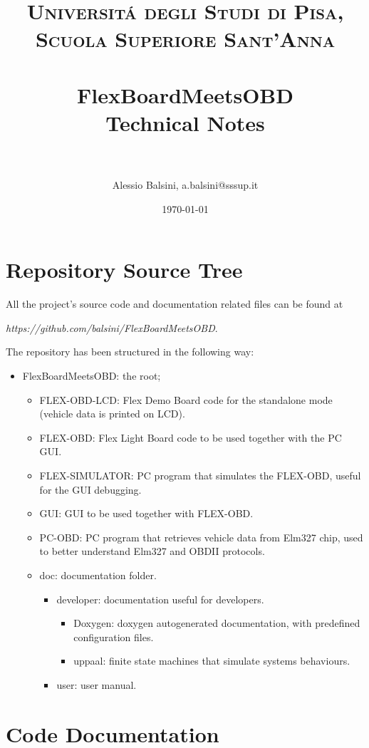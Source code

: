 \documentclass[paper=a4, fontsize=11pt]{scrartcl} %
\title{	
\normalfont \normalsize 
\textsc{Universit\'a degli Studi di Pisa, Scuola Superiore Sant'Anna} \\ [25pt] %
\horrule{0.5pt} \\[0.4cm] %
\huge FlexBoardMeetsOBD \\ %
\large Technical Notes \\
\horrule{2pt} \\[0.5cm] %
}
\author{Alessio Balsini, a.balsini@sssup.it} %
\date{\normalsize\today} %
\numberwithin{equation}{section} %
\numberwithin{figure}{section} %
\numberwithin{table}{section} %
\begin{document}
\maketitle %

\section{Repository Source Tree}

All the project's source code and documentation related files can be found at

\emph{https://github.com/balsini/FlexBoardMeetsOBD}.

The repository has been structured in the following way:

\begin{itemize}
	\item FlexBoardMeetsOBD: the root;
		\begin{itemize}
		\item FLEX-OBD-LCD: Flex Demo Board code for the standalone mode (vehicle data is printed on LCD).
		\item FLEX-OBD: Flex Light Board code to be used together with the PC GUI.
		\item FLEX-SIMULATOR: PC program that simulates the FLEX-OBD, useful for the GUI debugging.
		\item GUI: GUI to be used together with FLEX-OBD.
		\item PC-OBD: PC program that retrieves vehicle data from Elm327 chip, used to better understand Elm327 and OBDII protocols.
		\item doc: documentation folder.
		\begin{itemize}
			\item developer: documentation useful for developers.
			\begin{itemize}
				\item Doxygen: doxygen autogenerated documentation, with predefined configuration files.
				\item uppaal: finite state machines that simulate systems behaviours.
			\end{itemize}
			\item user: user manual.
		\end{itemize}
		\end{itemize}
\end{itemize}

\section{Code Documentation}
\end{document}
